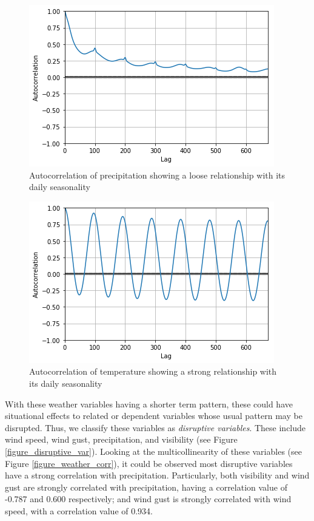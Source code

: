 \begin{figure}
  \includegraphics[width=\linewidth]
  {figures/figure_autocorr_precip.png}
  \caption{ Autocorrelation of precipitation showing a loose relationship with its daily seasonality}
  \label{figure_traffic_peakhour}
\end{figure}


\begin{figure}
  \includegraphics[width=\linewidth]{figures/figure_autocorr_temp.png}
  \caption{Autocorrelation of temperature showing a strong relationship with its daily seasonality}
  \label{figure_traffic_peakhour}
\end{figure}









With these weather variables having a shorter term pattern, these could have situational effects to related or dependent variables whose usual pattern may be disrupted. Thus, we classify these variables as \textit{disruptive variables}. These include wind speed, wind gust, precipitation, and visibility (see Figure \ref{figure_disruptive_var}). Looking at the multicollinearity of these variables (see Figure \ref{figure_weather_corr}), it could be observed most disruptive variables have a strong correlation with precipitation. Particularly, both visibility and wind gust are strongly correlated with precipitation, having a correlation value of -0.787 and 0.600 respectively; and wind gust is strongly correlated with wind speed, with a correlation value of 0.934.


